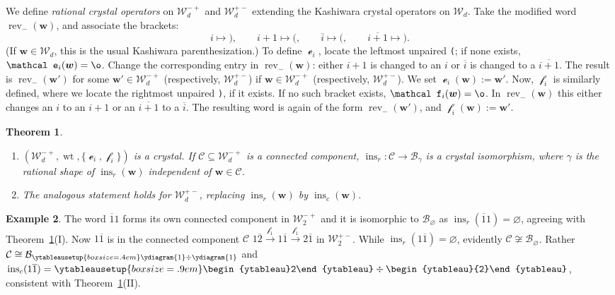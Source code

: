 \documentclass[12pt]{amsart}
\newcommand{\bs}{\boldsymbol}
\DeclareMathOperator{\worde}{{\mathcal e}}
\DeclareMathOperator{\wordf}{{\mathcal f}}
\DeclareMathOperator{\ins}{\operatorname{ins}}
\newtheorem{theorem}{Theorem}[section]
\theoremstyle{definition}
\newtheorem{example}[theorem]{Example}
\theoremstyle{remark}
\newcommand{\barindex}[1]{\overline{#1}}
\begin{document}
We define \emph{rational crystal operators} on ${\mathcal W}_d^{-+}$ and 
${\mathcal W}_d^{+-}$ extending the  
Kashiwara crystal operators on ${\mathcal W}_d$. 
Take the modified word $\operatorname{rev}_{-}({\bs w})$, and associate the brackets:
\[
i\mapsto {\texttt{)}},\qquad i{+}1\mapsto {\texttt (},\qquad \barindex{i}\mapsto {\texttt (},\qquad \barindex{i{+}1}\mapsto 
{\texttt )}.
\]
(If ${\bs w}\in {\mathcal W}_d$, this is the usual Kashiwara parenthesization.)
To define $\worde_i$, locate the leftmost unpaired {\tt (}; if none exists, $\worde_i({\bs w})=\o$.
Change the corresponding entry in $\operatorname{rev}_{-}({\bs w})$: either $i+1$ is changed to an $i$ or $\barindex{i}$ is changed to a $\barindex{i+1}$. The result is 
$\operatorname{rev}_{-}({\bs w}')$ for some ${\bs w}'\in {\mathcal W}_d^{-+}$ (respectively,
${\mathcal W}_d^{+-}$) if
${\bs w}\in {\mathcal W}_d^{-+}$ (respectively, ${\mathcal W}_d^{+-}$). We set $\worde_i({\bs w}) := {\bs w}'$.
Now, $\wordf_i$ is similarly defined, where we locate
the rightmost unpaired {\tt )}, if it exists.
If no such bracket exists, $\wordf_i({\bs w})=\o$. In $\operatorname{rev}_{-}({\bs w})$ this either changes an $i$  to an $i+1$ or an $\barindex{i+1}$ to a $\barindex{i}$.
The resulting word is again of the form
$\operatorname{rev}_{-}(\bs w')$, and $\wordf_i(\bs w):=\bs w'$.

\begin{theorem} \label{thm:stembridge-word-crystals}
\begin{enumerate}
\item[(I)] $({\mathcal W}^{-+}_d, \operatorname{wt}, \{\worde_i, \wordf_i\})$ is a crystal. If $\mathcal{C}\subseteq {\mathcal W}^{-+}_d$  is a connected component, 
$\ins_r:{\mathcal C}\to {\mathcal B}_{\gamma}$
is a crystal isomorphism, where $\gamma$ is the rational shape of $\ins_r({\bs w})$ independent of ${\bs w}\in {\mathcal C}$.
\item[(II)] The analogous statement holds for ${\mathcal W}_d^{+-}$, replacing
$\ins_r({\bs w})$ by $\ins_c({\bs w})$.
\end{enumerate}
\end{theorem}

\begin{example}
The word $\barindex{1}1$ forms its own connected component in ${\mathcal W}_{2}^{-+}$
and it is isomorphic to ${\mathcal B}_{\varnothing}$ as $\operatorname{ins}_r(\operatorname{\barindex{1}1})=\varnothing$,
agreeing with  Theorem~\ref{thm:stembridge-word-crystals}(I).
Now $1\barindex{1}$ is in the connected component ${\mathcal C}$
$1\barindex{2} \xrightarrow{\wordf_1} 1\barindex{1} \xrightarrow{\wordf_1} 2\barindex{1}$
in ${\mathcal W}_2^{+-}$. While $\ins_r(1\barindex{1})=\varnothing$, evidently
${\mathcal C}\not\cong {\mathcal B}_{\varnothing}$. Rather ${\mathcal C}\cong 
{\mathcal B}_{\ytableausetup{boxsize=.4em} \ydiagram{1}\div \ydiagram{1}}$ and 
$\ins_c(1\barindex{1})=\ytableausetup{boxsize=.9em}\begin{ytableau}2\end{ytableau}
\div\begin{ytableau}{2}\end{ytableau}$, consistent with Theorem~\ref{thm:stembridge-word-crystals}(II).
\end{example}
\end{document}

